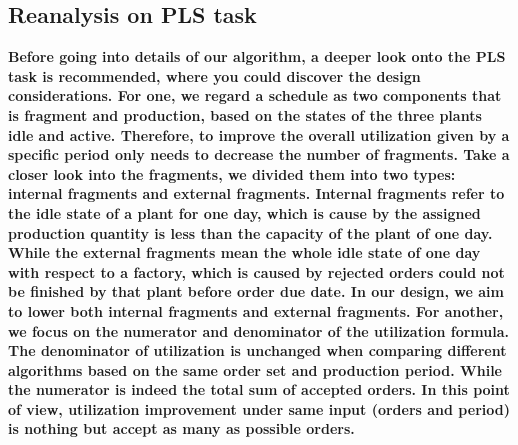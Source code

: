 \documentclass[conference]{IEEEtran}
\begin{document}
\subsection{\textbf{Reanalysis on PLS task}}
\textbf{Before going into details of our algorithm, a deeper look onto the PLS task is recommended, where you could discover the design considerations. 
For one, we regard a schedule as two components that is fragment and production, based on the states of the three plants idle and active. Therefore, to improve the overall utilization given by a specific period only needs to decrease the number of fragments. Take a closer look into the fragments, we divided them into two types: internal fragments and external fragments. Internal fragments refer to the idle state of a plant for one day, which is cause by the assigned production quantity is less than the capacity of the plant of one day. While the external fragments mean the whole idle state of one day with respect to a factory, which is caused by rejected orders could not be finished by that plant before order due date. In our design, we aim to lower both internal fragments and external fragments.
For another, we focus on the numerator and denominator of the utilization formula. The denominator of utilization is unchanged when comparing different algorithms based on the same order set and production period. While the numerator is indeed the total sum of accepted orders. In this point of view, utilization improvement under same input (orders and period) is nothing but accept as many as possible orders.}
\end{document}
